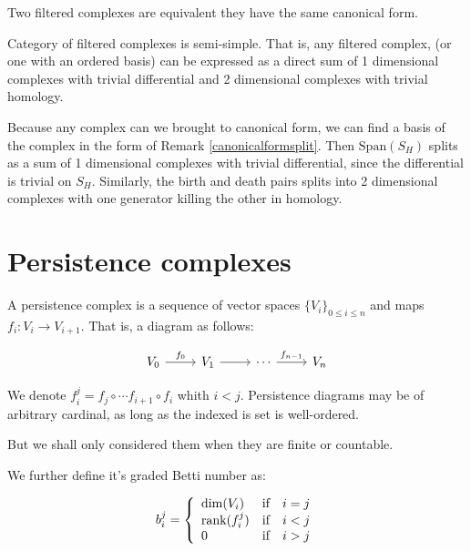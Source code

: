 \begin{corollary}
Two filtered complexes are equivalent
\ifff they have the same canonical form.
\end{corollary}


\begin{corollary}{Category of filtered complexes is semi-simple.}
That is, any filtered complex, (or one with an ordered basis) can be expressed as a direct sum of 
1 dimensional complexes with trivial differential and 2 dimensional complexes with trivial homology.
\end{corollary}

\begin{prof}
Because any complex can we brought to canonical form, we can find a basis of the complex in the form of Remark \ref{canonicalformsplit}.
Then $\text{Span}(S_H)$ splits as a sum of 1 dimensional complexes with trivial differential, since the differential is trivial on $S_H$.
Similarly, the birth and death pairs splits into 2 dimensional complexes with one generator killing the other in homology.

\end{prof}

\section{Persistence complexes}

\begin{definition}
A persistence complex is a sequence of vector spaces 
$\{V_i\}_{0\leq i \leq n}$ and maps $f_i:V_i\to V_{i+1}$. That is, a diagram
as follows:


$$
\begin{tikzcd}
V_0 \arrow[r,"f_0"]
& V_1 \arrow[r]
& \cdots\arrow[r,"f_{n-1}"]
& V_n
\end{tikzcd}
$$


We denote $f_i^j
=
f_j\circ\cdots f_{i+1}\circ f_i
$ whith $i<j$.
Persistence diagrams may be of arbitrary cardinal,
as long as the indexed is set is well-ordered.

But we shall only considered them when they are finite or countable.

We further define it's graded Betti number as:

$$
b_i^j
=\left\{
\begin{array}{l c c}
\dim(V_i) & \text{if} & i=j\\
\text{rank}(f_i^j) & \text{if} & i<j\\
0 & \text{if} & i>j\\
\end{array}
\right.
$$

\end{definition}


